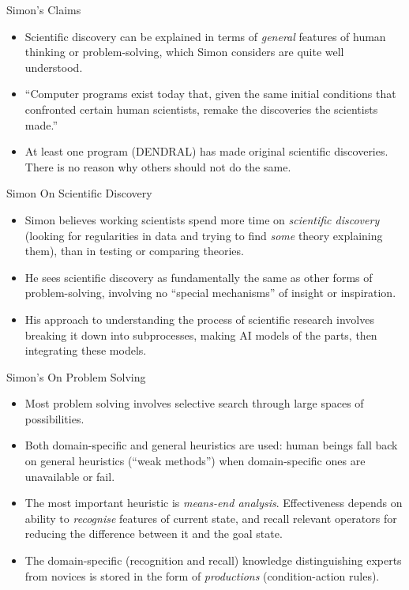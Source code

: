 \documentclass{article}
\begin{document}
\begin{slide}{}
{\Large Simon's Claims}
\begin{itemize}
\item Scientific discovery can be explained in terms of {\em
general} features of human thinking or problem-solving, which Simon
considers are quite well understood.
\item ``Computer programs exist today that, given the
same initial conditions that confronted certain human scientists,
remake the discoveries the scientists made.'' 
\item At least one program (DENDRAL) has made original scientific
discoveries. There is no reason why others should not do the same.
\end{itemize}
\end{slide}

\begin{slide}{}
{\Large Simon On Scientific Discovery}
\begin{itemize}
\item Simon believes working scientists spend more time on {\em scientific
discovery} (looking
for regularities in data and trying to find {\em some} theory
explaining them), than in testing or comparing theories.
\item He sees scientific discovery as fundamentally the same as other
forms of problem-solving, involving no ``special mechanisms'' of
insight or inspiration.
\item His approach to understanding the process of scientific research involves
breaking it down into subprocesses, making AI models of the parts,
then integrating these models.
\end{itemize}
\end{slide}

\begin{slide}{}
{\Large Simon's On Problem Solving}
\begin{itemize}
\item Most problem solving involves selective search through large
spaces of possibilities.
\item Both domain-specific and general heuristics are used: human
beings fall back on general heuristics
(``weak methods'') when domain-specific ones are
unavailable or fail.
\item The most important heuristic is {\em means-end
analysis}. Effectiveness depends on ability to {\em recognise}
features of
current state, and recall relevant operators for
reducing the difference between it and the goal state.
\item The domain-specific (recognition and recall) knowledge
distinguishing experts from novices is stored in the form of {\em
productions} (condition-action rules).
\end{itemize}
\end{slide}
\end{document}
